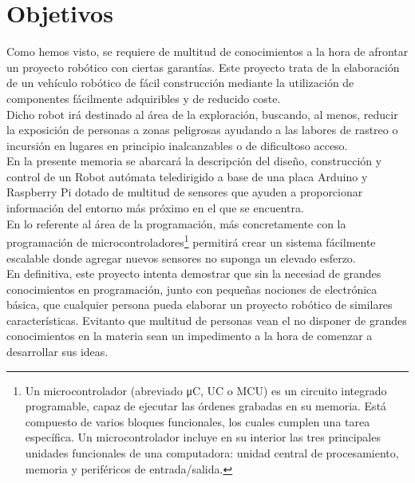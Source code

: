 

\section{Objetivos}
\label{sec:objetivos}

Como hemos visto, se requiere de multitud de conocimientos a la hora de afrontar un proyecto robótico con ciertas garantías. Este proyecto trata de la elaboración 
de un vehículo robótico de fácil construcción mediante la utilización de componentes fácilmente adquiribles y de reducido coste.\\

Dicho robot irá destinado al área de la exploración, buscando, al menos, reducir la exposición de personas a zonas peligrosas ayudando a las labores de rastreo 
o incursión en lugares en principio inalcanzables o de dificultoso acceso.\\

En la presente memoria se abarcará la descripción del diseño, construcción y control de un Robot autómata teledirigido a base de una placa Arduino y Raspberry Pi dotado de multitud de sensores que ayuden a proporcionar 
información del entorno más próximo en el que se encuentra.\\

En lo referente al área de la programación, más concretamente con la programación de microcontroladores\footnote{Un microcontrolador (abreviado μC, UC o MCU) es un circuito integrado programable, capaz de 
ejecutar las órdenes grabadas en su memoria. Está compuesto de varios bloques funcionales, los cuales cumplen una tarea específica. Un microcontrolador incluye en su interior las
tres principales unidades funcionales de una computadora: unidad central de procesamiento, memoria y periféricos de entrada/salida. } permitirá crear un sistema fácilmente escalable
donde agregar nuevos sensores no suponga un elevado esferzo.\\

En definitiva, este proyecto intenta demostrar que sin la necesiad de grandes conocimientos en programación, junto con pequeñas nociones de electrónica básica, que cualquier
persona pueda elaborar un proyecto robótico de similares características. Evitanto que multitud de personas vean el no disponer de grandes conocimientos en la materia sean un impedimento a la 
hora de comenzar a desarrollar sus ideas.\\


